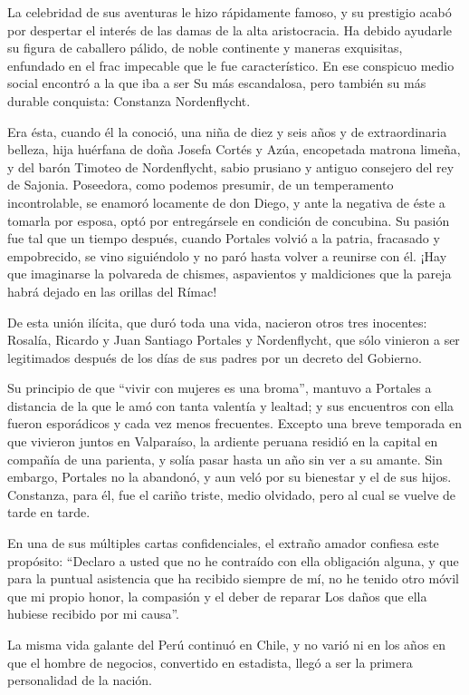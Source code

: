 \documentclass[10pt,twoside,openright]{memoir}
\begin{document}
La celebridad de sus aventuras le hizo rápidamente famoso, y su prestigio 
acabó por despertar el interés de las damas de la alta aristocracia. Ha 
debido ayudarle su figura de caballero pálido, de noble continente y 
maneras exquisitas, enfundado en el frac impecable que le fue característico.
En ese conspicuo medio social encontró a la que iba a ser Su más escandalosa, 
pero también su más durable conquista: Constanza Nordenflycht.

Era ésta, cuando él la conoció, una
niña de diez y seis años y de extraordinaria belleza, hija huérfana de
doña Josefa Cortés y Azúa, encopetada matrona limeña, y del barón
Timoteo de Nordenflycht, sabio prusiano y antiguo consejero del rey de
Sajonia. Poseedora, como podemos presumir, de un temperamento
incontrolable, se enamoró locamente de don Diego, y ante la negativa de
éste a tomarla por esposa, optó por entregársele en condición de
concubina. Su pasión fue tal que un tiempo después, cuando Portales
volvió a la patria, fracasado y empobrecido, se vino siguiéndolo y no
paró hasta volver a reunirse con él. ¡Hay que imaginarse la polvareda de
chismes, aspavientos y maldiciones que la pareja habrá dejado en las
orillas del Rímac!

De esta unión ilícita, que duró
toda una vida, nacieron otros tres inocentes: Rosalía, Ricardo y Juan
Santiago Portales y Nordenflycht, que sólo vinieron a ser legitimados
después de los días de sus padres por un decreto del Gobierno.

Su principio de que ``vivir con
mujeres es una broma'', mantuvo a Portales a distancia de la que le amó
con tanta valentía y lealtad; y sus encuentros con ella fueron
esporádicos y cada vez menos frecuentes. Excepto una breve temporada en
que vivieron juntos en Valparaíso, la ardiente peruana residió en la
capital en compañía de una parienta, y solía pasar hasta un año sin ver
a su amante. Sin embargo, Portales no la abandonó, y aun veló por su
bienestar y el de sus hijos. Constanza, para él, fue el cariño
triste, medio olvidado, pero al cual se vuelve de tarde en tarde.

En una de sus múltiples cartas confidenciales, el extraño amador
confiesa este propósito: ``Declaro a usted que no he contraído con ella
obligación alguna, y que para la puntual asistencia que ha recibido
siempre de mí, no he tenido otro móvil que mi propio honor, la compasión
y el deber de reparar Los daños que ella hubiese recibido por mi causa''.

La misma vida galante del Perú continuó en Chile, y no varió ni en los
años en que el hombre de negocios, convertido en estadista, llegó a ser
la primera personalidad de la nación.
\end{document}
